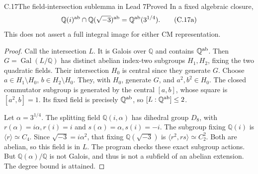 \begin{statement}{C.17}{The field-intersection sublemma in Lead 7}{Proved}
In a fixed algebraic closure,
\[
 \mathbb Q(i)^{\rm ab}
   \cap\mathbb Q(\sqrt{-3})^{\rm ab}
       =\mathbb Q^{\rm ab}(3^{1/4}).
 \tag{C.17a}
\]
This does not assert a full integral
image for either CM representation.
\end{statement}
\begin{proof}
Call the intersection \(L\).
It is Galois over \(\mathbb Q\) and
contains \(\mathbb Q^{\rm ab}\).
Then \(G=\operatorname{Gal}(L/\mathbb Q)\)
has distinct abelian index-two subgroups
\(H_1,H_2\), fixing the two quadratic fields.
Their intersection \(H_0\) is central
since they generate \(G\).
Choose \(a\in H_1\setminus H_0\),
\(b\in H_2\setminus H_0\).
They, with \(H_0\), generate \(G\), and
\(a^2,b^2\in H_0\).
The closed commutator subgroup is
generated by the central \([a,b]\),
whose square is \([a^2,b]=1\).
Its fixed field is precisely
\(\mathbb Q^{\rm ab}\), so
\([L:\mathbb Q^{\rm ab}]\le2\).

Let \(\alpha=3^{1/4}\).
The splitting field \(\mathbb Q(i,\alpha)\)
has dihedral group \(D_8\), with
\(r(\alpha)=i\alpha,r(i)=i\) and
\(s(\alpha)=\alpha,s(i)=-i\).
The subgroup fixing \(\mathbb Q(i)\)
is \(\langle r\rangle\simeq C_4\).
Since \(\sqrt{-3}=i\alpha^2\), that
fixing \(\mathbb Q(\sqrt{-3})\) is
\(\langle r^2,rs\rangle\simeq C_2^2\).
Both are abelian, so this field is in
\(L\). The program
checks these exact subgroup actions.
But \(\mathbb Q(\alpha)/\mathbb Q\)
is not Galois, and thus is not a
subfield of an abelian extension.
The degree bound is attained.
\end{proof}

